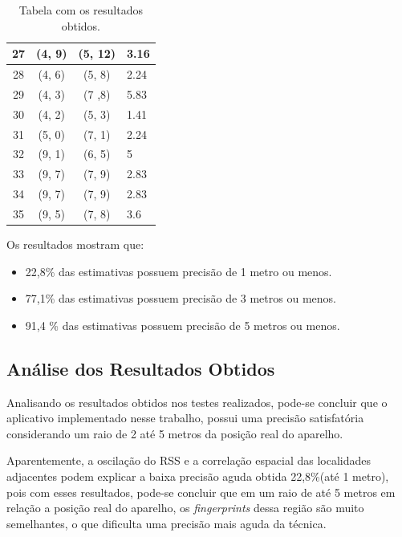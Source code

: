 \begin{table}[h]
\begin{center}
{\begin{minipage}{\textwidth}
\begin{tabular}{| c | c | c | p{3cm} |}
	    27 & (4, 9) & (5, 12) & 3.16 \\ \hline
	    28 & (4, 6) & (5, 8) & 2.24 \\ \hline
	    29 & (4, 3) & (7 ,8) & 5.83 \\ \hline
	    30 & (4, 2) & (5, 3) & 1.41 \\ \hline
	    31 & (5, 0) & (7, 1) & 2.24 \\ \hline
	    32 & (9, 1) & (6, 5) & 5 \\ \hline
	    33 & (9, 7) & (7, 9) & 2.83 \\ \hline
	    34 & (9, 7) & (7, 9) & 2.83 \\ \hline 
	    35 & (9, 5) & (7, 8) & 3.6 \\ \hline 
	 \end{tabular}
	 \caption[Table caption text]{Tabela com os resultados obtidos. }
	 \label{table:name}
	 
	\end{minipage} }
		 \end{center}
     \end{table}
     
      Os resultados mostram que:
     
     \begin{itemize}
      \item 22,8\% das estimativas possuem precisão de 1 metro ou menos.
      \item 77,1\% das estimativas possuem precisão de 3 metros ou menos.
      \item 91,4 \% das estimativas possuem precisão de 5 metros ou menos.
     \end{itemize}
     \clearpage
     \subsection{Análise dos Resultados Obtidos}
      
      Analisando os resultados obtidos nos testes realizados, pode-se concluir que 
      o aplicativo implementado nesse trabalho, possui uma precisão satisfatória 
      considerando um raio de 2 até 5 metros da posição real do aparelho.
      
      Aparentemente, a oscilação do RSS e a correlação 
      espacial das localidades adjacentes podem explicar a baixa precisão aguda 
      obtida 22,8\%(até 1 metro), pois com esses resultados, pode-se concluir que em um 
      raio de até 5 metros em relação a posição real do aparelho, os \textit{fingerprints} 
      dessa região são muito semelhantes, o que dificulta uma precisão mais aguda da técnica.
      
